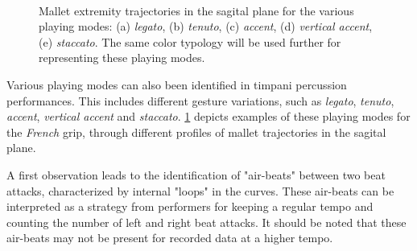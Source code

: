 \begin{figure}
\begin{center}
		\hspace{6mm}
		\\
	\end{center}
	\vspace{-0.6cm}
	\caption[Playing modes]{Mallet extremity trajectories in the sagital plane for the various playing modes: (a) \emph{legato}, (b) \emph{tenuto}, (c) \emph{accent}, (d) \emph{vertical accent}, (e) \emph{staccato}. The same color typology will be used further for representing these playing modes.}
	\label{fig:playingModes}
\end{figure}

Various playing modes can also been identified in timpani percussion performances. This includes different gesture variations, such as \emph{legato}, \emph{tenuto}, \emph{accent}, \emph{vertical accent} and \emph{staccato}. \myfigname \ref{fig:playingModes} depicts examples of these playing modes for the \emph{French} grip, through different profiles of mallet trajectories in the sagital plane.

A first observation leads to the identification of "air-beats" between two beat attacks, characterized by internal "loops" in the curves. These air-beats can be interpreted as a strategy from performers for keeping a regular tempo and counting the number of left and right beat attacks. It should be noted that these air-beats may not be present for recorded data at a higher tempo.

